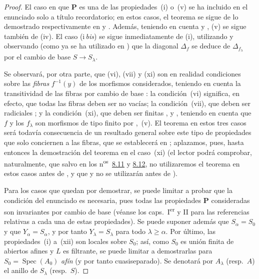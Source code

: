 \begin{proof}
El caso en que $\boldsymbol{P}$ es una de las propiedades~(i) o~(v) se ha incluido en el enunciado solo a título recordatorio; en estos casos, el teorema se sigue de lo demostrado respectivamente en  y .
Además, teniendo en cuenta  y , (v) se sigue también de (iv).
El caso (i\,\emph{bis}) se sigue inmediatamente de (i), utilizando  y observando (como ya se ha utilizado en ) que la diagonal $\Delta_f$ se deduce de $\Delta_{f_\lambda}$ por el cambio de base $S\to S_\lambda$.

Se observará, por otra parte, que (vi), (vii) y (xi) son en realidad condiciones sobre las \emph{fibras} $f^{-1}(y)$ de los morfismos considerados, teniendo en cuenta la transitividad de las fibras por cambio de base : la condición~(vi) significa, en efecto, que todas las fibras deben ser no vacías; la condición~(vii), que deben ser radiciales ; y la condición~(xi), que deben ser finitas ,  y , teniendo en cuenta que $f$ y los $f_\lambda$ son morfismos de tipo finito por ,~(v).
El teorema en estos tres casos será todavía consecuencia de un resultado general sobre este tipo de propiedades que solo conciernen a las fibras, que se establecerá en ; aplazamos, pues, hasta entonces la demostración del teorema en el caso~(xi) (el lector podrá comprobar, naturalmente, que salvo en los n\textsuperscript{os}~{\hyperlink{ega4.c04.subsec.8-11}{8.11}} y {\hyperlink{ega4.c04.subsec.8-12}{8.12}}, no utilizaremos el teorema en estos casos antes de , y que  y  no se utilizarán antes de ).

Para los casos que quedan por demostrar, se puede limitar a probar que la condición del enunciado es necesaria, pues todas las propiedades $\boldsymbol{P}$ consideradas son invariantes por cambio de base (véanse los caps.~I\textsuperscript{er} y II para las referencias relativas a cada una de estas propiedades).
Se puede suponer además que $S_\alpha=S_0$ y que $Y_\alpha=S_\alpha$, y por tanto $Y_\lambda=S_\lambda$ para todo $\lambda\geq\alpha$.
Por último, las propiedades~(i) a~(xii) son locales sobre $S_0$; así, como $S_0$ es unión finita de abiertos afines y $L$ es filtrante, se puede limitar a demostrarlas para $S_0=\operatorname{Spec}(A_0)$ \emph{afín} (y por tanto cuasiseparado).
Se denotará por $A_\lambda$ (resp.\ $A$) el anillo de $S_\lambda$ (resp.\ $S$).


\end{proof}
